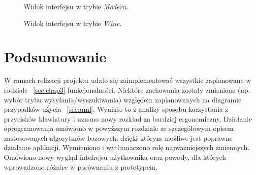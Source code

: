 \documentclass[twoside,a4paper]{book}
\begin{document}
				 \begin{figure}
		\centering
		\caption{Widok interfejsu w trybie \textit{Modern}.}
		\label{fig:modern}
		\end{figure}
		 \begin{figure}
		\centering
		\caption{Widok interfejsu w trybie \textit{Wine}.}
		\label{fig:wine}
		\end{figure}
\section{Podsumowanie}
W ramach relizacji projektu udało się zaimplementować wszystkie zaplanowane w rodziale ~\ref{sec:chap3} funkcjonalności. Niektóre zachowania zostały zmienione (np. wybór trybu wysyłania/wyszukiwania) względem zaplanowanych na diagramie przypadków użycia ~\ref{sec:uml}. Wynikło to z analizy sposobu korzystania z przycisków klawiatury i uznano nowy rozkład za bardziej ergonomiczny. Działanie oprogramowania omówiono w powyższym rozdziale ze szczegółowym opisem zastosowanych algorytmów bazowych, dzięki którym możliwe jest poprawne dzia\-ła\-nie aplikacji. Wymieniono i wytłumaczono rolę najważniejszych zmiennych. Omówiono nowy wygląd intefrejsu użytkownika oraz powody, dla których wprowadzono różnice w porównaniu z prototypem.  

 
\end{document}

